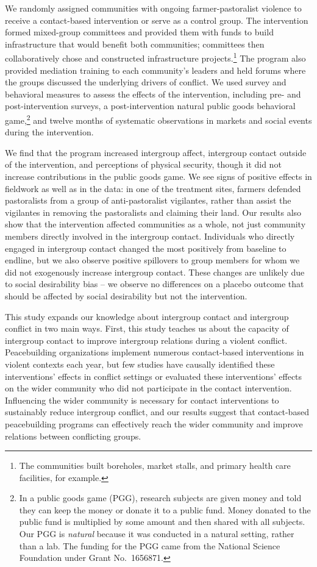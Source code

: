 \documentclass[11pt]{article}
\begin{document}
We randomly assigned communities with ongoing farmer-pastoralist
violence to receive a contact-based intervention or serve as a control
group. The intervention formed mixed-group committees and provided them
with funds to build infrastructure that would benefit both communities;
committees then collaboratively chose and constructed infrastructure
projects.\footnote{The communities built boreholes, market stalls, and
  primary health care facilities, for example.} The program also
provided mediation training to each community's leaders and held forums
where the groups discussed the underlying drivers of conflict. We used
survey and behavioral measures to assess the effects of the
intervention, including pre- and post-intervention surveys, a
post-intervention natural public goods behavioral game,\footnote{In a
  public goods game (PGG), research subjects are given money and told
  they can keep the money or donate it to a public fund. Money donated
  to the public fund is multiplied by some amount and then shared with
  all subjects. Our PGG is \emph{natural} because it was conducted in a
  natural setting, rather than a lab. The funding for the PGG came from
  the National Science Foundation under Grant No.~1656871.} and twelve
months of systematic observations in markets and social events during
the intervention.

We find that the program increased intergroup affect, intergroup contact
outside of the intervention, and perceptions of physical security,
though it did not increase contributions in the public goods game. We
see signs of positive effects in fieldwork as well as in the data: in
one of the treatment sites, farmers defended pastoralists from a group
of anti-pastoralist vigilantes, rather than assist the vigilantes in
removing the pastoralists and claiming their land. Our results also show
that the intervention affected communities as a whole, not just
community members directly involved in the intergroup contact.
Individuals who directly engaged in intergroup contact changed the most
positively from baseline to endline, but we also observe positive
spillovers to group members for whom we did not exogenously increase
intergroup contact. These changes are unlikely due to social
desirability bias -- we observe no differences on a placebo outcome that
should be affected by social desirability but not the intervention.

This study expands our knowledge about intergroup contact and intergroup
conflict in two main ways. First, this study teaches us about the
capacity of intergroup contact to improve intergroup relations during a
violent conflict. Peacebuilding organizations implement numerous
contact-based interventions in violent contexts each year, but few
studies have causally identified these interventions' effects in
conflict settings or evaluated these interventions' effects on the wider
community who did not participate in the contact intervention.
Influencing the wider community is necessary for contact interventions
to sustainably reduce intergroup conflict, and our results suggest that
contact-based peacebuilding programs can effectively reach the wider
community and improve relations between conflicting groups.
\end{document}
